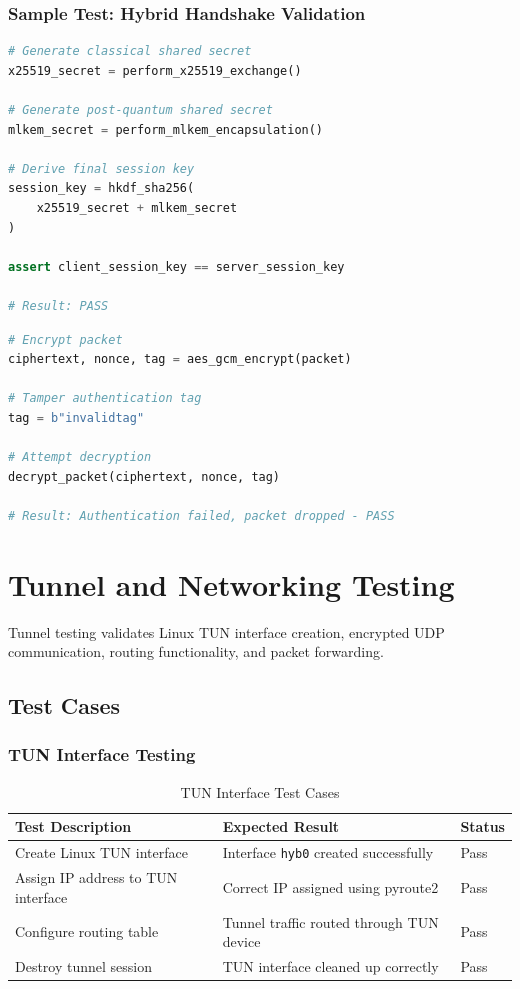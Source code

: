 \subsubsection{Sample Test: Hybrid Handshake Validation}

\begin{lstlisting}[language=Python, caption={Test: Hybrid Handshake Validation}]
# Generate classical shared secret
x25519_secret = perform_x25519_exchange()

# Generate post-quantum shared secret
mlkem_secret = perform_mlkem_encapsulation()

# Derive final session key
session_key = hkdf_sha256(
    x25519_secret + mlkem_secret
)

assert client_session_key == server_session_key

# Result: PASS
\end{lstlisting}

\begin{lstlisting}[language=Python, caption={Test: AES-256-GCM Integrity Validation}]
# Encrypt packet
ciphertext, nonce, tag = aes_gcm_encrypt(packet)

# Tamper authentication tag
tag = b"invalidtag"

# Attempt decryption
decrypt_packet(ciphertext, nonce, tag)

# Result: Authentication failed, packet dropped - PASS
\end{lstlisting}

\section{Tunnel and Networking Testing}
\label{sec:tunnel_testing}

Tunnel testing validates Linux TUN interface creation, encrypted UDP communication, routing functionality, and packet forwarding.

\subsection{Test Cases}

\subsubsection{TUN Interface Testing}

\begin{table}[H]
\centering
\begin{tabularx}{\textwidth}{|X|X|l|}
\hline
\textbf{Test Description} & \textbf{Expected Result} & \textbf{Status} \\ \hline
Create Linux TUN interface & Interface \texttt{hyb0} created successfully & Pass \\ \hline
Assign IP address to TUN interface & Correct IP assigned using pyroute2 & Pass \\ \hline
Configure routing table & Tunnel traffic routed through TUN device & Pass \\ \hline
Destroy tunnel session & TUN interface cleaned up correctly & Pass \\ \hline
\end{tabularx}
\caption{TUN Interface Test Cases}
\end{table}

